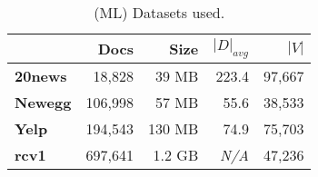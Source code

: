 \begin{table}[t]
\centering
{\small
\begin{tabular}{|l|r|r|r|r|}
    \hline & \textbf{Docs} & \textbf{Size} & \textbf{$|D|_{avg}$} & \textbf{$|V|$} \\
    \hline
    \textbf{20news}  & 18,828     & 39 MB  & 223.4      & 97,667     \\
    \textbf{Newegg}  & 106,998    & 57 MB  & 55.6       & 38,533     \\
    \textbf{Yelp}    & 194,543    & 130 MB & 74.9       & 75,703 \\
    \textbf{rcv1}    & 697,641    & 1.2 GB & \emph{N/A} & 47,236 \\
    \hline
\end{tabular}
}
\caption{(ML) Datasets used.}
\label{table:ml-datasets}
\end{table}
